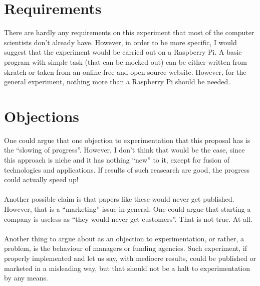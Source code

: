 \documentclass[english]{report}
\begin{document}
\section{Requirements}

There are hardly any requirements on this experiment that most of the computer scientists don't already have. However, in order to be more specific, I would suggest that the experiment would be carried out on a Raspberry Pi. A basic program with simple task (that can be mocked out) can be either written from skratch or taken from an online free and open source website. However, for the general experiment, nothing more than a Raspberry Pi should be needed.

\section{Objections}

One could argue that one objection to experimentation that this proposal has is the ``slowing of progress''. However, I don't think that would be the case, since this approach is niche and it has nothing ``new'' to it, except for fusion of technologies and applications. If results of such reasearch are good, the progress could actually speed up!\\\\

\noindent
Another possible claim is that papers like these would never get published. However, that is a ``marketing'' issue in general. One could argue that starting a company is useless as ``they would never get customers''. That is not true. At all.\\\\

\noindent
Another thing to argue about as an objection to experimentation, or rather, a problem, is the behaviour of managers or funding agencies. Such experiment, if properly implemented and let us say, with mediocre results, could be published or marketed in a misleading way, but that should not be a halt to experimentation by any means.\\\\


\renewcommand{\bibname}{References}

\end{document}
